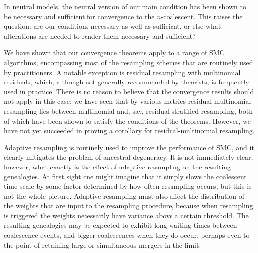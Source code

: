 In neutral models, the neutral version of our main condition has been shown to be necessary and sufficient for convergence to the $n$-coalescent. This raises the question: are our conditions necessary as well as sufficient, or else what alterations are needed to render them necessary and sufficient?

We have shown that our convergence theorems apply to a range of SMC algorithms, encompassing most of the resampling schemes that are routinely used by practitioners. A notable exception is residual resampling with multinomial residuals, which, although not generally recommended by theorists, is frequently used in practice.
There is no reason to believe that the convergence results should not apply in this case: we have seen that by various metrics residual-multinomial resampling lies between multinomial and, say, residual-stratified resampling, both of which have been shown to satisfy the conditions of the theorems.
However, we have not yet succeeded in proving a corollary for residual-multinomial resampling.

Adaptive resampling is routinely used to improve the performance of SMC, and it clearly mitigates the problem of ancestral degeneracy. It is not immediately clear, however, what exactly is the effect of adaptive resampling on the resulting genealogies. At first sight one might imagine that it simply slows the coalescent time scale by some factor determined by how often resampling occurs, but this is not the whole picture. Adaptive resampling must also affect the distribution of the weights that are input to the resampling procedure, because when resampling is triggered the weights necessarily have variance above a certain threshold.
The resulting genealogies may be expected to exhibit long waiting times between coalescence events, and bigger coalescences when they do occur, perhaps even to the point of retaining large or simultaneous mergers in the limit.
